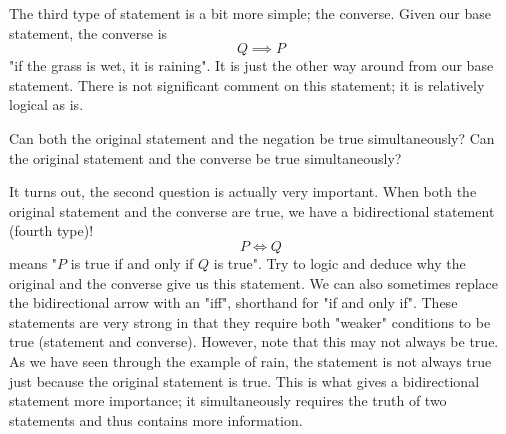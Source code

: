 The third type of statement is a bit more simple; the converse. Given our base statement, the converse is 
\[Q \implies P\]
\noindent "if the grass is wet, it is raining". It is just the other way around from our base statement. There is not significant comment on this statement; it is relatively logical as is.

\begin{exercise}
Can both the original statement and the negation be true simultaneously? Can the original statement and the converse be true simultaneously?
\end{exercise}

It turns out, the second question is actually very important. When both the original statement and the converse are true, we have a bidirectional statement (fourth type)! 
\[P \iff Q\]
\noindent means "$P$ is true if and only if $Q$ is true". Try to logic and deduce why the original and the converse give us this statement. We can also sometimes replace the bidirectional arrow with an "iff", shorthand for "if and only if". These statements are very strong in that they require both "weaker" conditions to be true (statement and converse). However, note that this may not always be true. As we have seen through the example of rain, the statement is not always true just because the original statement is true. This is what gives a bidirectional statement more importance; it simultaneously requires the truth of two statements and thus contains more information.

